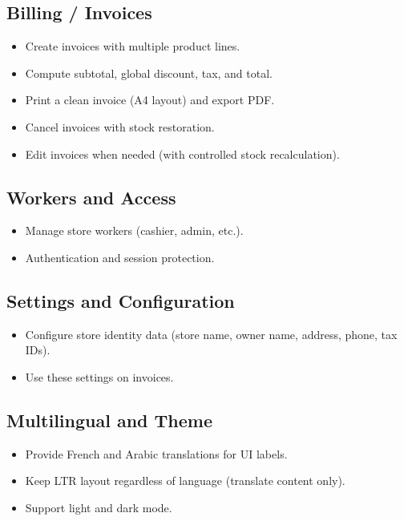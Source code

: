 \documentclass[12pt,a4paper]{report}
\begin{document}
\subsection*{Billing / Invoices}
\begin{itemize}
  \item Create invoices with multiple product lines.
  \item Compute subtotal, global discount, tax, and total.
  \item Print a clean invoice (A4 layout) and export PDF.
  \item Cancel invoices with stock restoration.
  \item Edit invoices when needed (with controlled stock recalculation).
\end{itemize}

\subsection*{Workers and Access}
\begin{itemize}
  \item Manage store workers (cashier, admin, etc.).
  \item Authentication and session protection.
\end{itemize}

\subsection*{Settings and Configuration}
\begin{itemize}
  \item Configure store identity data (store name, owner name, address, phone, tax IDs).
  \item Use these settings on invoices.
\end{itemize}

\subsection*{Multilingual and Theme}
\begin{itemize}
  \item Provide French and Arabic translations for UI labels.
  \item Keep LTR layout regardless of language (translate content only).
  \item Support light and dark mode.
\end{itemize}
\end{document}
